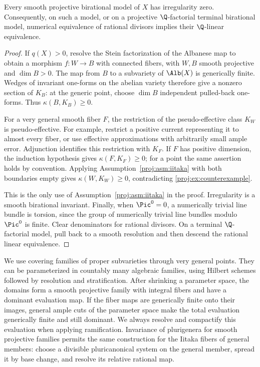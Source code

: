 \begin{lemma}\label{proj:ex:irregularity}
Every smooth projective birational model of \(X\) has irregularity zero.
Consequently, on such a model, or on a projective \(\Q\)-factorial
terminal birational model, numerical equivalence of rational divisors
implies their \(\Q\)-linear equivalence.
\end{lemma}
\begin{proof}
If \(q(X)>0\), resolve the Stein factorization of the Albanese map to
obtain a morphism \(f:W\to B\) with connected fibers, with \(W,B\)
smooth projective and \(\dim B>0\). The map from \(B\) to a subvariety
of \(\Alb(X)\) is generically finite. Wedges of invariant one-forms
on the abelian variety therefore give a nonzero section of \(K_B\):
at the generic point, choose \(\dim B\) independent pulled-back
one-forms. Thus \(\kappa(B,K_B)\geq0\).

For a very general smooth fiber \(F\), the restriction of the
pseudo-effective class \(K_W\) is pseudo-effective. For example, restrict
a positive current representing it to almost every fiber, or use
effective approximations with arbitrarily small ample error.
Adjunction identifies this restriction with \(K_F\). If \(F\) has
positive dimension, the induction hypothesis gives
\(\kappa(F,K_F)\geq0\); for a point the same assertion holds by
convention. Applying Assumption~\ref{proj:asm:iitaka} with both boundaries
empty gives \(\kappa(W,K_W)\geq0\), contradicting
\eqref{proj:ex:counterexample}.

This is the only use of Assumption~\ref{proj:asm:iitaka} in the proof.
Irregularity is a smooth birational invariant. Finally, when
\(\Pic^0=0\), a numerically trivial line bundle is torsion, since the
group of numerically trivial line bundles modulo \(\Pic^0\) is
finite. Clear denominators for rational divisors. On a terminal
\(\Q\)-factorial model, pull back to a smooth resolution and then
descend the rational linear equivalence.
\end{proof}

We use covering families of proper subvarieties through very general
points. They can be parameterized in countably many algebraic
families, using Hilbert schemes followed by resolution and
stratification. After shrinking a parameter space, the domains form
a smooth projective family with integral fibers and have a dominant
evaluation map. If the fiber maps are generically finite onto their
images, general ample cuts of the parameter space make the total
evaluation generically finite and still dominant. We always resolve
and compactify this evaluation when applying ramification.
Invariance of plurigenera for smooth projective families
\cite[Theorem~1]{Proj-Paun2007} permits the same construction for the
Iitaka fibers of general members: choose a divisible pluricanonical
system on the general member, spread it by base change, and resolve
its relative rational map.

